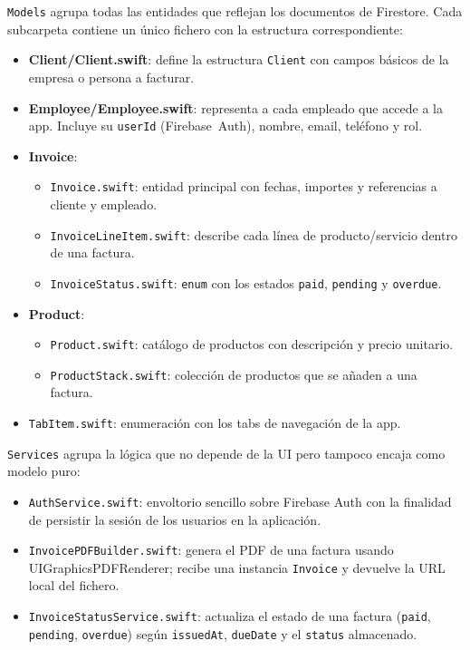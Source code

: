 \begin{large}
\texttt{Models} agrupa todas las entidades que reflejan los documentos de Firestore. Cada subcarpeta contiene un único fichero con la estructura correspondiente:
\begin{itemize}
  \item \textbf{Client/Client.swift}: define la estructura \texttt{Client} con campos básicos de la empresa o persona a facturar.
  \item \textbf{Employee/Employee.swift}: representa a cada empleado que accede a la app. Incluye su \texttt{userId} (Firebase Auth), nombre, email, teléfono y rol.
  \item \textbf{Invoice}:
    \begin{itemize}
      \item \texttt{Invoice.swift}: entidad principal con fechas, importes y referencias a cliente y empleado.
      \item \texttt{InvoiceLineItem.swift}: describe cada línea de producto/servicio dentro de una factura.
      \item \texttt{InvoiceStatus.swift}: \texttt{enum} con los estados \texttt{paid}, \texttt{pending} y \texttt{overdue}.
    \end{itemize}
  \item \textbf{Product}:
    \begin{itemize}
      \item \texttt{Product.swift}: catálogo de productos con descripción y precio unitario.
      \item \texttt{ProductStack.swift}: colección de productos que se añaden a una factura.
    \end{itemize}
  \item \texttt{TabItem.swift}: enumeración con los tabs de navegación de la app.
\end{itemize}

\texttt{Services} agrupa la lógica que no depende de la UI pero tampoco encaja como modelo puro:
\begin{itemize}
  \item \texttt{AuthService.swift}: envoltorio sencillo sobre Firebase Auth con la finalidad de persistir la sesión de los usuarios en la aplicación.
  \item \texttt{InvoicePDFBuilder.swift}: genera el PDF de una factura usando UIGraphicsPDFRenderer; recibe una instancia \texttt{Invoice} y devuelve la URL local del fichero.
  \item \texttt{InvoiceStatusService.swift}: actualiza el estado de una factura (\texttt{paid}, \texttt{pending}, \texttt{overdue}) según \texttt{issuedAt}, \texttt{dueDate} y el \texttt{status} almacenado.
\end{itemize}


\end{large}

